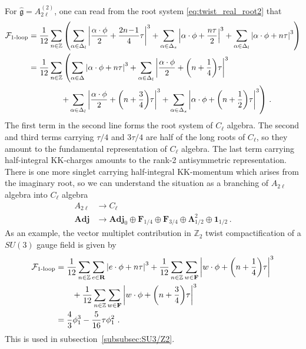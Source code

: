 For $ \hat{\mathfrak{g}} = A_{2\ell}^{(2)} $, one can read from the root system \eqref{eq:twist_real_root2} that
\begin{align}
\mathcal{F}_{\text{1-loop}}
&= \frac{1}{12} \sum_{n \in \mathbb{Z}} \qty(\sum_{\alpha \in \Delta_l} \abs{\frac{\alpha\cdot \phi}{2} + \frac{2n\!-\!1}{4}\tau}^3 + \sum_{\alpha \in \Delta_s} \abs{\alpha\cdot \phi + \frac{n \tau}{2}}^3 + \sum_{\alpha \in \Delta_l} \abs{\alpha\cdot \phi + n \tau}^3 ) \nonumber \\
&= \frac{1}{12} \sum_{n \in \mathbb{Z}} \left(\sum_{\alpha \in \Delta} \abs{\alpha\cdot \phi+ n \tau}^3 + \sum_{\alpha \in \Delta_l} \abs{\frac{\alpha\cdot \phi}{2} + \qty(n+\frac{1}{4})\tau}^3 \right. \nonumber \\
& \qquad \qquad \left. +\sum_{\alpha \in \Delta_l} \abs{\frac{\alpha\cdot \phi}{2} + \qty(n+\frac{3}{4})\tau}^3+\sum_{\alpha \in \Delta_s} \abs{\alpha\cdot \phi + \qty(n+\frac{1}{2})\tau}^3\right) \, .
\end{align}
The first term in the second line forms the root system of $ C_\ell $ algebra. The second and third terms carrying $\tau/4 $ and $3\tau/4$ are half of the long roots of $ C_\ell $, so they amount to the fundamental representation of $ C_\ell $ algebra. The last term carrying half-integral KK-charges amounts to the rank-2 antisymmetric representation. There is one more singlet carrying half-integral KK-momentum which arises from the imaginary root, so we can understand the situation as a branching of $A_{2\ell}$ algebra into $C_\ell$ algebra
\begin{align}\label{eq:A_2l_branching}
A_{2\ell} &\to C_\ell \nonumber \\
\mathbf{Adj} &\to \mathbf{Adj}_0 \oplus \mathbf{F}_{1/4} \oplus \mathbf{F}_{3/4} \oplus \mathbf{\Lambda}^2_{1/2} \oplus \mathbf{1}_{1/2} \, .
\end{align}
As an example, the vector multiplet contribution in $ \mathbb{Z}_2 $ twist compactification of a $SU(3)$ gauge field is given by
\begin{align}
\mathcal{F}_{\text{1-loop}}
& = \frac{1}{12} \sum_{n \in \mathbb{Z}} \sum_{e \in \mathbf{R}} \abs{e\cdot \phi+n \tau }^3 + \frac{1}{12} \sum_{n \in \mathbb{Z}} \sum_{w \in \mathbf{F}} \abs{w\cdot \phi+\qty(n + \frac{1}{4})\tau}^3  \nonumber \\
& \qquad + \frac{1}{12} \sum_{n \in \mathbb{Z}} \sum_{w \in \mathbf{F}} \abs{w\cdot \phi+\qty(n + \frac{3}{4})\tau}^3 \nonumber \\
&= \frac{4}{3}\phi_1^3 - \frac{5}{16}\tau \phi_1^2 \ .
\end{align}
This is used in subsection~\ref{subsubsec:SU3/Z2}.


